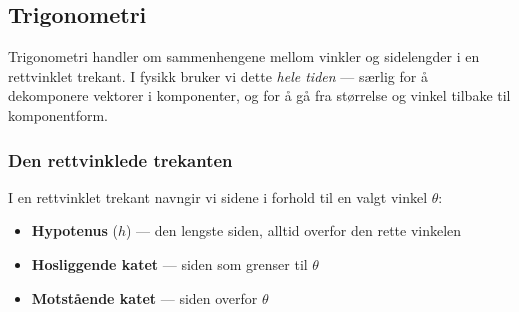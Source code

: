
\subsection{Trigonometri}

Trigonometri handler om sammenhengene mellom vinkler og sidelengder i en rettvinklet trekant. I fysikk bruker vi dette \textit{hele tiden} — særlig for å dekomponere vektorer i komponenter, og for å gå fra størrelse og vinkel tilbake til komponentform.

\subsubsection*{Den rettvinklede trekanten}

I en rettvinklet trekant navngir vi sidene i forhold til en valgt vinkel $\theta$:
\begin{itemize}
    \item \textbf{Hypotenus} ($h$) — den lengste siden, alltid overfor den rette vinkelen
    \item \textbf{Hosliggende katet} — siden som grenser til $\theta$
    \item \textbf{Motstående katet} — siden overfor $\theta$
\end{itemize}

